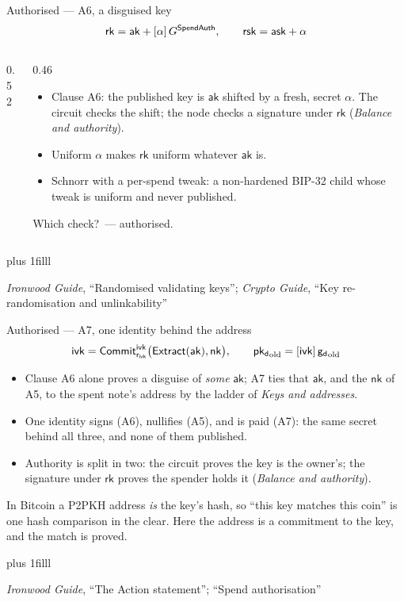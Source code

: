 \documentclass[aspectratio=169,11pt]{beamer}
\newcommand{\rksym}{\ensuremath{\mathsf{rk}}}
\newcommand{\gd}{\ensuremath{\mathsf{g_d}}}
\newcommand{\pkd}{\ensuremath{\mathsf{pk_d}}}
\newcommand{\aksym}{\ensuremath{\mathsf{ak}}}
\newcommand{\nksym}{\ensuremath{\mathsf{nk}}}
\newcommand{\asksym}{\ensuremath{\mathsf{ask}}}
\newcommand{\ivk}{\ensuremath{\mathsf{ivk}}}
\newcommand{\rivk}{\ensuremath{\mathsf{r_{ivk}}}}
\newcommand{\rsk}{\ensuremath{\mathsf{rsk}}}
\newcommand{\Extract}{\ensuremath{\mathsf{Extract}}}
\newcommand{\CommitIvk}{\ensuremath{\mathsf{Commit}^{\mathsf{ivk}}}}
\newcommand{\src}[1]{\par\vskip0pt plus 1filll
  {\fontsize{6}{7.2}\selectfont\color{arbdim}\raggedright #1\par}}
\begin{document}
\begin{frame}{Authorised --- A6, a disguised key}
\vspace{-6pt}
\[
\rksym = \aksym + [\alpha]\,\Egsa, \qquad \rsk = \asksym + \alpha
\]
\vspace{-10pt}
\begin{columns}[T]
\begin{column}{0.52\textwidth}
\centering\ActionBox[rk]
\end{column}
\begin{column}{0.46\textwidth}
\begin{itemize}\small
  \item Clause A6: the published key is $\aksym$ shifted by a fresh,
    secret $\alpha$. The circuit checks the shift; the node checks a
    signature under $\rksym$ (\emph{Balance and authority}).
  \item Uniform $\alpha$ makes $\rksym$ uniform whatever $\aksym$ is.
  \item Schnorr with a per-spend tweak: a non-hardened BIP-32 child
    whose tweak is uniform and never published.
\end{itemize}
\smallskip
\alert{Which check?}\pause\ --- authorised.
\end{column}
\end{columns}
\src{\emph{Ironwood Guide}, ``Randomised validating keys''; \emph{Crypto Guide},
``Key re-randomisation and unlinkability''}
\end{frame}

\begin{frame}{Authorised --- A7, one identity behind the address}
\begin{gather*}
\ivk = \CommitIvk_{\rivk}\bigl(\Extract(\aksym), \nksym\bigr), \qquad
\Eold{\pkd} = [\ivk]\,\Eold{\gd}
\end{gather*}
\begin{itemize}
  \item Clause A6 alone proves a disguise of \emph{some} $\aksym$; A7
    ties that
    $\aksym$, and the $\nksym$ of A5, to the spent note's address by
    the ladder of \emph{Keys and addresses}.
  \item One identity signs (A6), nullifies (A5), and is paid (A7): the
    same secret behind all three, and none of them published.
  \item Authority is split in two: the circuit proves the key is the
    owner's; the signature under $\rksym$ proves the spender holds it
    (\emph{Balance and authority}).
\end{itemize}
\medskip
\small In Bitcoin a P2PKH address \emph{is} the key's hash, so ``this key
matches this coin'' is one hash comparison in the clear. Here the
address is a commitment to the key, and the match is proved.
\src{\emph{Ironwood Guide}, ``The Action statement''; ``Spend authorisation''}
\end{frame}
\end{document}
